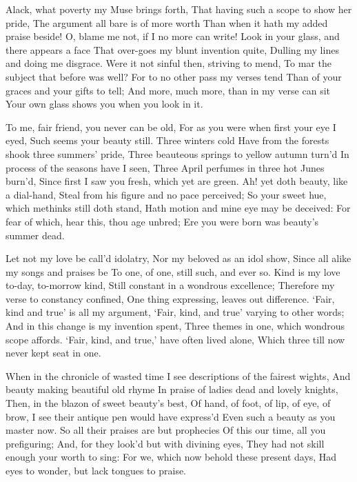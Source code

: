 \documentclass[twocolumn]{book}
\begin{document}
Alack, what poverty my Muse brings forth,
That having such a scope to show her pride,
The argument all bare is of more worth
Than when it hath my added praise beside!
O, blame me not, if I no more can write!
Look in your glass, and there appears a face
That over-goes my blunt invention quite,
Dulling my lines and doing me disgrace.
Were it not sinful then, striving to mend,
To mar the subject that before was well?
For to no other pass my verses tend
Than of your graces and your gifts to tell;
  And more, much more, than in my verse can sit
  Your own glass shows you when you look in it.


To me, fair friend, you never can be old,
For as you were when first your eye I eyed,
Such seems your beauty still. Three winters cold
Have from the forests shook three summers' pride,
Three beauteous springs to yellow autumn turn'd
In process of the seasons have I seen,
Three April perfumes in three hot Junes burn'd,
Since first I saw you fresh, which yet are green.
Ah! yet doth beauty, like a dial-hand,
\numerus*{}Steal from his figure and no pace perceived;
So your sweet hue, which methinks still doth stand,
Hath motion and mine eye may be deceived:
  For fear of which, hear this, thou age unbred;
  Ere you were born was beauty's summer dead.


Let not my love be call'd idolatry,
Nor my beloved as an idol show,
Since all alike my songs and praises be
To one, of one, still such, and ever so.
Kind is my love to-day, to-morrow kind,
Still constant in a wondrous excellence;
Therefore my verse to constancy confined,
One thing expressing, leaves out difference.
`Fair, kind and true' is all my argument,
`Fair, kind, and true' varying to other words;
And in this change is my invention spent,
Three themes in one, which wondrous scope affords.
  `Fair, kind, and true,' have often lived alone,
  Which three till now never kept seat in one.


When in the chronicle of wasted time
I see descriptions of the fairest wights,
And beauty making beautiful old rhyme
In praise of ladies dead and lovely knights,
Then, in the blazon of sweet beauty's best,
Of hand, of foot, of lip, of eye, of brow,
I see their antique pen would have express'd
Even such a beauty as you master now.
So all their praises are but prophecies
Of this our time, all you prefiguring;
And, for they look'd but with divining eyes,
They had not skill enough your worth to sing:
  For we, which now behold these present days,
  Had eyes to wonder, but lack tongues to praise.
\end{document}
